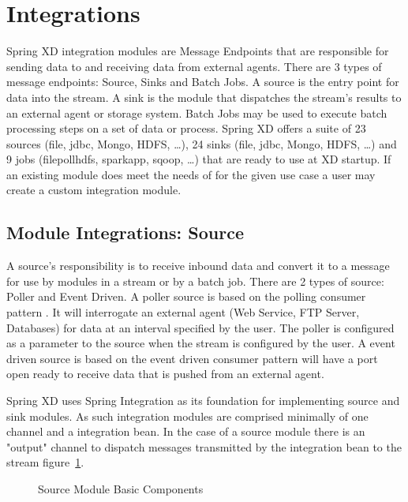 \section{Integrations}
Spring XD integration modules are Message Endpoints \cite{enterprise-integration-pattern-message-endpoint} 
that are responsible for sending data to and receiving data from external agents.  
There are 3 types of message endpoints: Source, Sinks and Batch Jobs.  
A source is the entry point for data into the stream. A sink is the module that dispatches 
the stream's results to an external agent or storage system.  Batch Jobs may be used to 
execute batch processing steps on a set of data or process.  
Spring XD offers a suite of 23 sources (file, jdbc, Mongo, HDFS, \ldots), 24 sinks
 (file, jdbc, Mongo, HDFS, \ldots) and 9 jobs
(filepollhdfs, sparkapp, sqoop, \ldots)  that are ready to use at XD startup.  
If an existing module does meet the needs of for the given use case a user may create a 
custom integration module.\par
\subsection{Module Integrations: Source}
A source's responsibility is to receive inbound data and convert it to a message for 
use by modules in a stream or by a batch job.  
There are 2 types of source: Poller and Event Driven.  A poller source is based on the polling 
consumer pattern \cite{enterprise-integration-pattern-pollingconsumer}. It 
will interrogate an external agent (Web Service, FTP Server, Databases) for data at an 
interval specified by the user.  The poller is configured as a parameter to the source when
the stream is configured by the user.  A event driven source is based on the event driven 
consumer pattern \cite{enterprise-integration-pattern-eventdrivenconsumer} will have a 
port open ready to receive data that is pushed from an external agent. 
  \par
Spring XD uses Spring Integration \cite{spring-integration-reference} as its foundation 
for implementing source and sink modules.  As such integration modules are 
comprised minimally of one channel and a integration bean.  In the case of a source module 
there is an "output" channel to dispatch messages transmitted by the integration bean to 
the stream figure~\ref{fig:sourcembc}. \par
\begin{figure}[ht]
\centering
{}
\caption{Source Module Basic Components}
\label{fig:sourcembc}
\end{figure}

